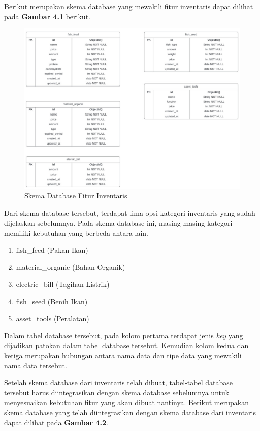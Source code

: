 \begin{spacing}{1.5}
	\hfill \break

	Berikut merupakan skema database yang mewakili fitur inventaris dapat dilihat pada \textbf{Gambar 4.1} berikut.
	
	\begin{figure}[H]
		\centering
		\includegraphics[width=1\textwidth]{gambar/sprint1/sprint1_inventaris_database.jpeg}
		\caption{Skema Database Fitur Inventaris}
	\end{figure}

	Dari skema database tersebut, terdapat lima opsi kategori inventaris yang sudah dijelaskan sebelumnya. Pada skema database ini, masing-masing kategori memiliki kebutuhan yang berbeda antara lain.

	\begin{enumerate}
		\item fish\_feed (Pakan Ikan)
		\item material\_organic (Bahan Organik)
		\item electric\_bill (Tagihan Listrik)
		\item fish\_seed (Benih Ikan)
		\item asset\_tools (Peralatan)
	\end{enumerate}

	Dalam tabel database tersebut, pada kolom pertama terdapat jenis \textit{key} yang dijadikan patokan dalam tabel database tersebut. Kemudian kolom kedua dan ketiga merupakan hubungan antara nama data dan tipe data yang mewakili nama data tersebut.

	Setelah skema database dari inventaris telah dibuat, tabel-tabel database tersebut harus diintegrasikan dengan skema database sebelumnya untuk menyesuaikan kebutuhan fitur yang akan dibuat nantinya. Berikut merupakan skema database yang telah diintegrasikan dengan skema database dari inventaris dapat dilihat pada \textbf{Gambar 4.2}.


\end{spacing}
